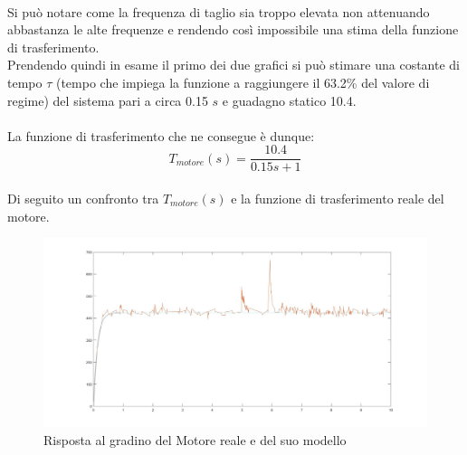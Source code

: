 \\Si può notare come la frequenza di taglio sia troppo elevata non attenuando abbastanza le alte frequenze e rendendo così impossibile una stima della funzione di trasferimento.\\
Prendendo quindi in esame il primo dei due grafici si può stimare una costante di tempo $\tau$ (tempo che impiega la funzione a raggiungere il 63.2\% del valore di regime) del sistema pari a circa 0.15 $s$ e guadagno statico 10.4.\\\\
La funzione di trasferimento che ne consegue è dunque:
\\
$$
T_{motore}(s)=\displaystyle\frac{10.4}{0.15s+1}
$$
\\
Di seguito un confronto tra $T_{motore}(s)$ e la funzione di trasferimento reale del motore.
\begin{figure}[ht]
	\centering
	\includegraphics[width=\textwidth]{modMotorvsReale.jpg}
	\caption{Risposta al gradino del Motore reale e del suo modello}
	\label{modMotorvsReale}
\end{figure}

